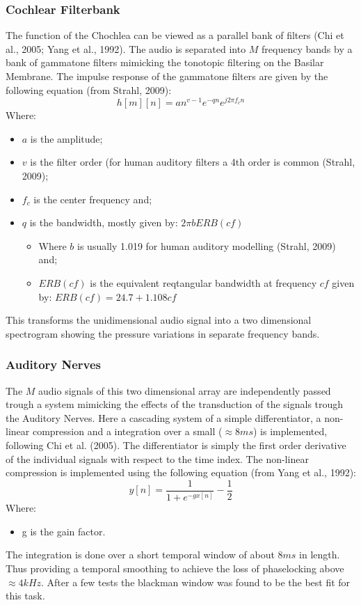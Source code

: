 \documentclass{article}
\begin{document}
\subsubsection{Cochlear Filterbank}
The function of the Chochlea can be viewed as a parallel bank of filters (Chi et al., 2005; Yang et al., 1992). The audio is separated into $M$ frequency bands by a bank of gammatone filters mimicking the tonotopic filtering on the Basilar Membrane. The impulse response of the gammatone filters are given by the following equation (from Strahl, 2009):
\begin{equation*}
h[m][n] = an^{v-1}e^{-qn}e^{j2\pi f_{c} n}
\end{equation*}
Where:
\begin{itemize}
	\item  $a$ is the amplitude; 
	\item $v$ is the filter order (for human auditory filters a 4th order is common (Strahl, 2009); 
	\item $f_{c}$ is the center frequency and;
	\item $q$ is the bandwidth, mostly given by: $2\pi b ERB(cf)$
	\begin{itemize}
		\item Where $b$ is usually 1.019 for human auditory modelling (Strahl, 2009) and;
		\item $ERB(cf)$ is the equivalent reqtangular bandwidth at frequency $cf$ given by: $ERB(cf) = 24.7 + 1.108 cf$
	\end{itemize}
\end{itemize}
This transforms the unidimensional audio signal into a two dimensional spectrogram showing the pressure variations in separate frequency bands.

\subsubsection{Auditory Nerves}
The $M$ audio signals of this two dimensional array are independently passed trough a system mimicking the effects of the transduction of the signals trough the Auditory Nerves. Here a cascading system of a simple differentiator, a non-linear compression and a integration over a small ($\approx 8ms$) is implemented, following Chi et al. (2005). The differentiator is simply the first order derivative of the individual signals with respect to the time index. 
The non-linear compression is implemented using the following equation (from Yang et al., 1992): 
\begin{equation*}
	y[n] = \frac{1}{1 + e^{-g x[n]}} - \frac{1}{2}
\end{equation*}
Where:
\begin{itemize}
	\item g is the gain factor.
\end{itemize}
The integration is done over a short temporal window of about $8ms$ in length. Thus providing a temporal smoothing to achieve the loss of phaselocking above $\approx 4kHz$. After a few tests the blackman window was found to be the best fit for this task.
\end{document}
